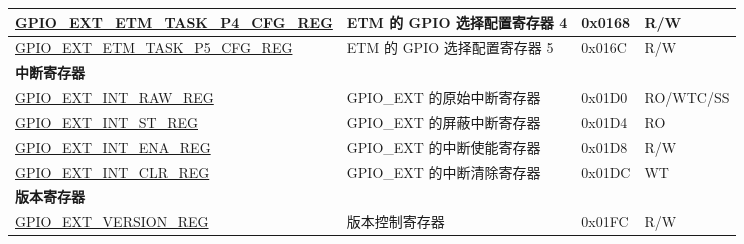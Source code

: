 \begin{longtable}{ | p{6.2cm} | p{7.0cm} | p{1.3cm} | p{1cm} | }
\hyperref[regdesc:GPIOEXTETMTASKP4CFGREG]{GPIO\_EXT\_ETM\_TASK\_P4\_CFG\_REG} & ETM 的 GPIO 选择配置寄存器 4 & 0x0168 & R/W \\ \hline
\hyperref[regdesc:GPIOEXTETMTASKP5CFGREG]{GPIO\_EXT\_ETM\_TASK\_P5\_CFG\_REG} & ETM 的 GPIO 选择配置寄存器 5 & 0x016C & R/W \\ \hline
\multicolumn{4}{|l|}{\textbf{中断寄存器}} \\ \hline
\hyperref[regdesc:GPIOEXTINTRAWREG]{GPIO\_EXT\_INT\_RAW\_REG} & GPIO\_EXT 的原始中断寄存器 & 0x01D0 & RO/WTC/SS \\ \hline
\hyperref[regdesc:GPIOEXTINTSTREG]{GPIO\_EXT\_INT\_ST\_REG} & GPIO\_EXT 的屏蔽中断寄存器 & 0x01D4 & RO \\ \hline
\hyperref[regdesc:GPIOEXTINTENAREG]{GPIO\_EXT\_INT\_ENA\_REG} & GPIO\_EXT 的中断使能寄存器 & 0x01D8 & R/W \\ \hline
\hyperref[regdesc:GPIOEXTINTCLRREG]{GPIO\_EXT\_INT\_CLR\_REG} & GPIO\_EXT 的中断清除寄存器 & 0x01DC & WT \\ \hline
\multicolumn{4}{|l|}{\textbf{版本寄存器}} \\ \hline
\hyperref[regdesc:GPIOEXTVERSIONREG]{GPIO\_EXT\_VERSION\_REG} & 版本控制寄存器 & 0x01FC & R/W \\ \hline
\end{longtable}
